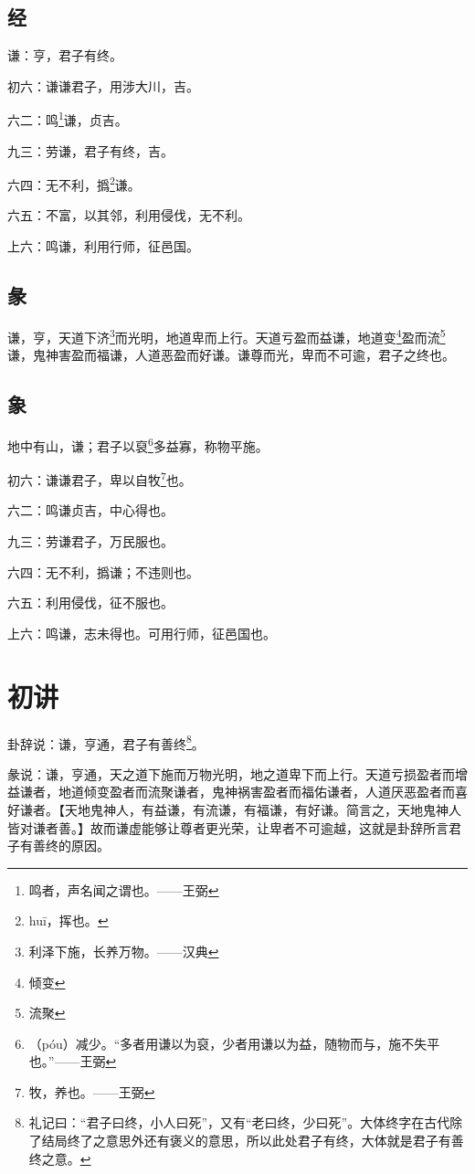 \documentclass[12pt,oneside]{book}
\begin{document}
\subsection{经}
谦：亨，君子有终。

初六：谦谦君子，用涉大川，吉。

六二：鸣\footnote{鸣者，声名闻之谓也。——王弼}谦，贞吉。

九三：劳谦，君子有终，吉。

六四：无不利，撝\footnote{huī，挥也。}谦。

六五：不富，以其邻，利用侵伐，无不利。

上六：鸣谦，利用行师，征邑国。

\subsection{彖}
谦，亨，天道下济\footnote{利泽下施，长养万物。——汉典}而光明，地道卑而上行。天道亏盈而益谦，地道变\footnote{倾变}盈而流\footnote{流聚}谦，鬼神害盈而福谦，人道恶盈而好谦。谦尊而光，卑而不可逾，君子之终也。

\subsection{象}
地中有山，谦；君子以裒\footnote{（póu）减少。“多者用谦以为裒，少者用谦以为益，随物而与，施不失平也。”——王弼}多益寡，称物平施。

初六：谦谦君子，卑以自牧\footnote{牧，养也。——王弼}也。

六二：鸣谦贞吉，中心得也。

九三：劳谦君子，万民服也。

六四：无不利，撝谦；不违则也。

六五：利用侵伐，征不服也。

上六：鸣谦，志未得也。可用行师，征邑国也。

\section{初讲}
卦辞说：谦，亨通，君子有善终\footnote{礼记曰：“君子曰终，小人曰死”，又有“老曰终，少曰死”。大体终字在古代除了结局终了之意思外还有褒义的意思，所以此处君子有终，大体就是君子有善终之意。}。

彖说：谦，亨通，天之道下施而万物光明，地之道卑下而上行。天道亏损盈者而增益谦者，地道倾变盈者而流聚谦者，鬼神祸害盈者而福佑谦者，人道厌恶盈者而喜好谦者。【天地鬼神人，有益谦，有流谦，有福谦，有好谦。简言之，天地鬼神人皆对谦者善。】故而谦虚能够让尊者更光荣，让卑者不可逾越，这就是卦辞所言君子有善终的原因。
\end{document}

